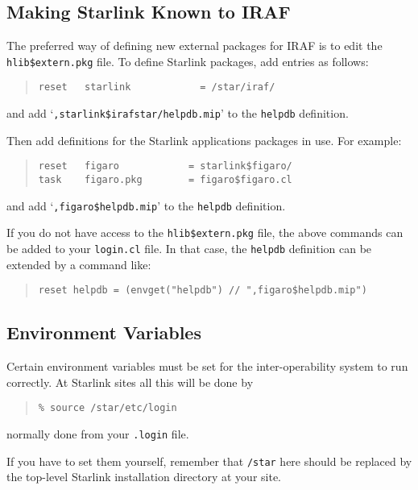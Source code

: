 \documentclass[twoside,11pt]{article}
\newcommand{\xlabel}[1]{}
\begin{document}
\subsection{\xlabel{making_starlink_known_to_iraf}Making Starlink Known to IRAF}
The preferred way of defining new external packages for IRAF is to edit
the \texttt{hlib\$extern.pkg} file. To define Starlink packages, add entries as
follows:
\begin{quote} \begin{verbatim}
reset   starlink            = /star/iraf/
\end{verbatim} \end{quote}
and add `{\texttt{,starlink\$irafstar/helpdb.mip}}' to the \texttt{helpdb}
definition.

Then add definitions for the Starlink applications packages in use.
For example:
\begin{quote} \begin{verbatim}
reset   figaro            = starlink$figaro/
task    figaro.pkg        = figaro$figaro.cl
\end{verbatim} \end{quote}
and add `{\texttt{,figaro\$helpdb.mip}}' to the \texttt{helpdb} definition.

If you do not have access to the \texttt{hlib\$extern.pkg} file, the above
commands can be added to your \texttt{login.cl} file. In that case, the
\texttt{helpdb} definition can be extended by a command like:
\begin{quote} \begin{verbatim}
reset helpdb = (envget("helpdb") // ",figaro$helpdb.mip")
\end{verbatim} \end{quote}

\subsection{\xlabel{environment_variables}Environment Variables}
Certain environment variables must be set for the inter-operability system to
run correctly. At Starlink sites all this will be done by
\begin{quote} \begin{verbatim}
% source /star/etc/login
\end{verbatim} \end{quote}
normally done from your \texttt{.login} file.

If you have to set them yourself, remember that \texttt{/star} here should be
replaced by the top-level Starlink installation directory at your site.
\end{document}
